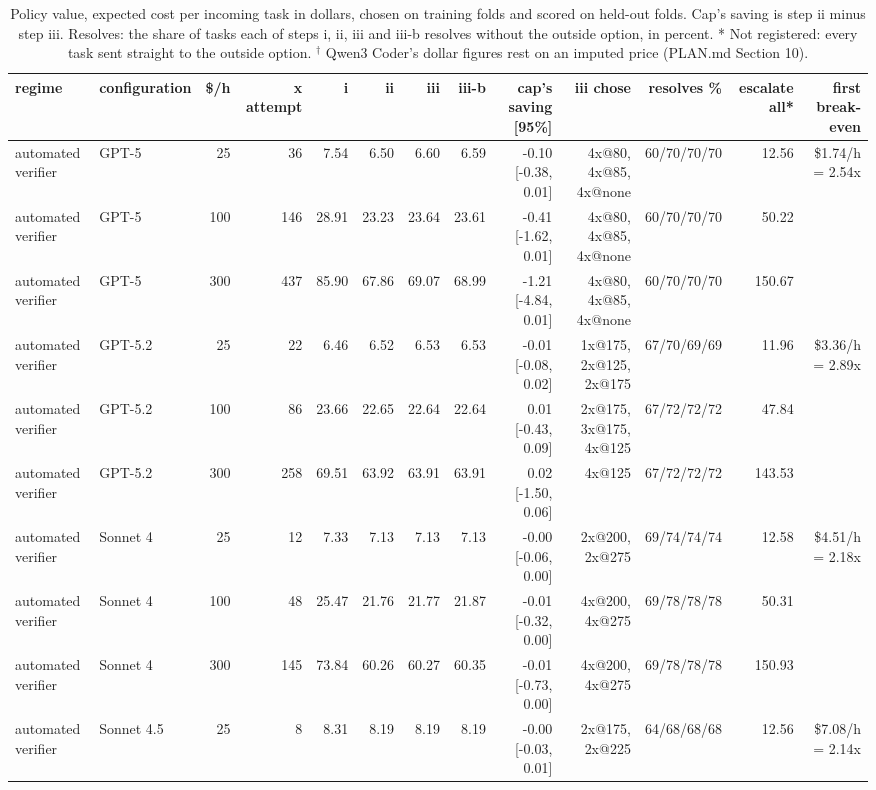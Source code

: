 \begin{table}[t]
\centering
\small
\caption{Policy value, expected cost per incoming task in dollars, chosen on training folds and scored on held-out folds. Cap's saving is step ii minus step iii. Resolves: the share of tasks each of steps i, ii, iii and iii-b resolves without the outside option, in percent. * Not registered: every task sent straight to the outside option. $^\dagger$ Qwen3 Coder's dollar figures rest on an imputed price (PLAN.md Section 10).}
\label{tab:table1_ladder}
\begin{tabular}{llrrrrrrrrrrr}
\toprule
regime & configuration & \$/h & x attempt & i & ii & iii & iii-b & cap's saving [95\%] & iii chose & resolves \% & escalate all* & first break-even \\
\midrule
automated verifier & GPT-5 & 25 & 36 & 7.54 & 6.50 & 6.60 & 6.59 & -0.10 [-0.38, 0.01] & 4x@80, 4x@85, 4x@none & 60/70/70/70 & 12.56 & \$1.74/h = 2.54x \\
automated verifier & GPT-5 & 100 & 146 & 28.91 & 23.23 & 23.64 & 23.61 & -0.41 [-1.62, 0.01] & 4x@80, 4x@85, 4x@none & 60/70/70/70 & 50.22 &  \\
automated verifier & GPT-5 & 300 & 437 & 85.90 & 67.86 & 69.07 & 68.99 & -1.21 [-4.84, 0.01] & 4x@80, 4x@85, 4x@none & 60/70/70/70 & 150.67 &  \\
automated verifier & GPT-5.2 & 25 & 22 & 6.46 & 6.52 & 6.53 & 6.53 & -0.01 [-0.08, 0.02] & 1x@175, 2x@125, 2x@175 & 67/70/69/69 & 11.96 & \$3.36/h = 2.89x \\
automated verifier & GPT-5.2 & 100 & 86 & 23.66 & 22.65 & 22.64 & 22.64 & 0.01 [-0.43, 0.09] & 2x@175, 3x@175, 4x@125 & 67/72/72/72 & 47.84 &  \\
automated verifier & GPT-5.2 & 300 & 258 & 69.51 & 63.92 & 63.91 & 63.91 & 0.02 [-1.50, 0.06] & 4x@125 & 67/72/72/72 & 143.53 &  \\
automated verifier & Sonnet 4 & 25 & 12 & 7.33 & 7.13 & 7.13 & 7.13 & -0.00 [-0.06, 0.00] & 2x@200, 2x@275 & 69/74/74/74 & 12.58 & \$4.51/h = 2.18x \\
automated verifier & Sonnet 4 & 100 & 48 & 25.47 & 21.76 & 21.77 & 21.87 & -0.01 [-0.32, 0.00] & 4x@200, 4x@275 & 69/78/78/78 & 50.31 &  \\
automated verifier & Sonnet 4 & 300 & 145 & 73.84 & 60.26 & 60.27 & 60.35 & -0.01 [-0.73, 0.00] & 4x@200, 4x@275 & 69/78/78/78 & 150.93 &  \\
automated verifier & Sonnet 4.5 & 25 & 8 & 8.31 & 8.19 & 8.19 & 8.19 & -0.00 [-0.03, 0.01] & 2x@175, 2x@225 & 64/68/68/68 & 12.56 & \$7.08/h = 2.14x \\

\end{tabular}
\end{table}
